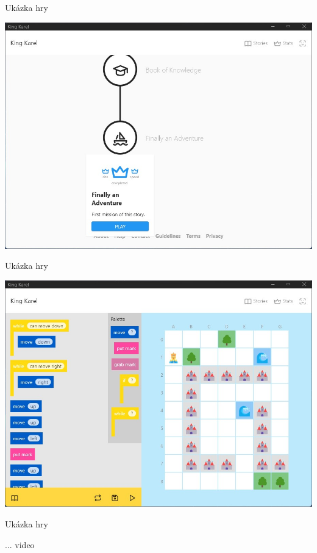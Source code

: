 \documentclass[czech,aspectratio=169]{beamer}
\begin{document}
  \begin{frame}{Ukázka hry}
    \begin{center}
      \includegraphics[width=.6\textwidth]{assets/slides/kingkarel_story}
    \end{center}
  \end{frame}

  \begin{frame}{Ukázka hry}
    \begin{center}
      \includegraphics[width=.6\textwidth]{assets/slides/kingkarel_game}
    \end{center}
  \end{frame}

  \begin{frame}{Ukázka hry}
    \begin{center}
      ... video
    \end{center}
  \end{frame}
\end{document}
